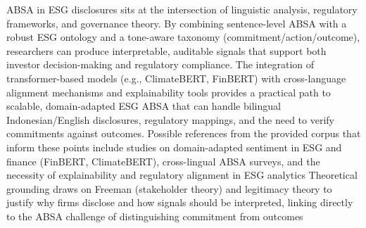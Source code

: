 ABSA in ESG disclosures sits at the intersection of linguistic analysis, regulatory frameworks, and governance theory. By combining sentence-level ABSA with a robust ESG ontology and a tone-aware taxonomy (commitment/action/outcome), researchers can produce interpretable, auditable signals that support both investor decision-making and regulatory compliance. The integration of transformer-based models (e.g., ClimateBERT, FinBERT) with cross-language alignment mechanisms and explainability tools provides a practical path to scalable, domain-adapted ESG ABSA that can handle bilingual Indonesian/English disclosures, regulatory mappings, and the need to verify commitments against outcomes.
Possible references from the provided corpus that inform these points include studies on domain-adapted sentiment in ESG and finance (FinBERT, ClimateBERT), cross-lingual ABSA surveys, and the necessity of explainability and regulatory alignment in ESG analytics \cite{10.1108/dta-01-2024-0065,10.1002/csr.70089,10.2139/ssrn.3738629,10.3390/math12193119,10.1016/j.inffus.2025.103073,10.1111/eufm.12509,10.48550/arxiv.2511.00024,10.1111/1911-3846.12832,10.21203/rs.3.rs-3600821/v1,10.48550/arxiv.2510.01222,10.18653/v1/2023.emnlp-main.975}  Theoretical grounding draws on Freeman (stakeholder theory) and legitimacy theory to justify why firms disclose and how signals should be interpreted, linking directly to the ABSA challenge of distinguishing commitment from outcomes \cite{10.3390/jrfm16100429,10.1002/csr.70116,10.1108/sampj-10-2020-0358,10.2139/ssrn.5130854,10.1177/21582440251383232}





